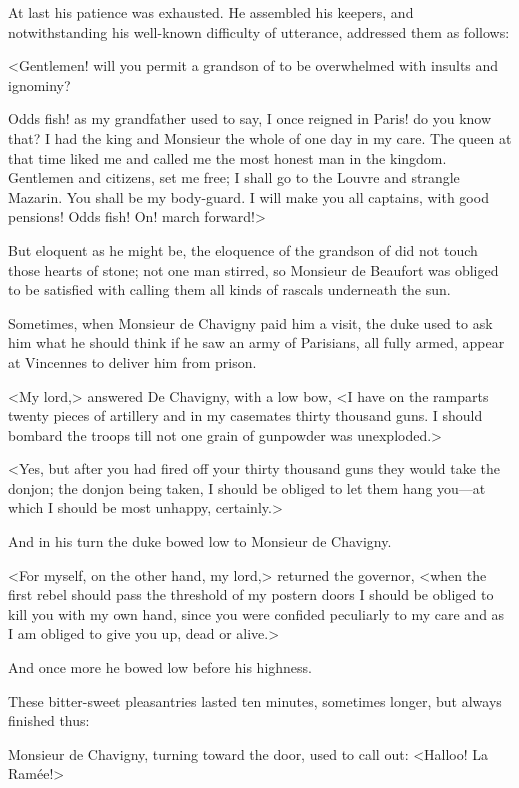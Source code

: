 At last his patience was exhausted. He assembled his keepers, and notwithstanding his well-known difficulty of utterance, addressed them as follows:

<Gentlemen! will you permit a grandson of  to be overwhelmed with insults and ignominy?

Odds fish! as my grandfather used to say, I once reigned in Paris! do you know that? I had the king and Monsieur the whole of one day in my care. The queen at that time liked me and called me the most honest man in the kingdom. Gentlemen and citizens, set me free; I shall go to the Louvre and strangle Mazarin. You shall be my body-guard. I will make you all captains, with good pensions! Odds fish! On! march forward!>

But eloquent as he might be, the eloquence of the grandson of  did not touch those hearts of stone; not one man stirred, so Monsieur de Beaufort was obliged to be satisfied with calling them all kinds of rascals underneath the sun.

Sometimes, when Monsieur de Chavigny paid him a visit, the duke used to ask him what he should think if he saw an army of Parisians, all fully armed, appear at Vincennes to deliver him from prison.

<My lord,> answered De Chavigny, with a low bow, <I have on the ramparts twenty pieces of artillery and in my casemates thirty thousand guns. I should bombard the troops till not one grain of gunpowder was unexploded.>

<Yes, but after you had fired off your thirty thousand guns they would take the donjon; the donjon being taken, I should be obliged to let them hang you—at which I should be most unhappy, certainly.>

And in his turn the duke bowed low to Monsieur de Chavigny.

<For myself, on the other hand, my lord,> returned the governor, <when the first rebel should pass the threshold of my postern doors I should be obliged to kill you with my own hand, since you were confided peculiarly to my care and as I am obliged to give you up, dead or alive.>

And once more he bowed low before his highness.

These bitter-sweet pleasantries lasted ten minutes, sometimes longer, but always finished thus:

Monsieur de Chavigny, turning toward the door, used to call out: <Halloo! La Ramée!>

